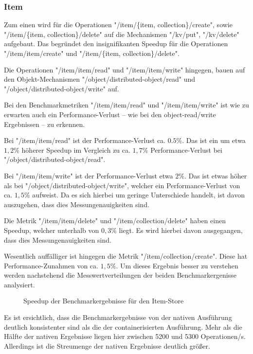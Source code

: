 \subsubsection{Item}

Zum einen wird für die Operationen "/item/\{item, collection\}/create", sowie "/item/\{item, collection\}/delete" auf die Mechanismen "/kv/put", "/kv/delete" aufgebaut. Das begründet den insignifikanten Speedup für die Operationen "/item/item/create" und "/item/\{item, collection\}/delete". 

Die Operationen "/item/item/read" und "/item/item/write" hingegen, bauen auf den Objekt-Mechanismen "/object/distributed-object/read" und "/object/distributed-object/write" auf.

Bei den Benchmarkmetriken "/item/item/read" und "/item/item/write" ist wie zu erwarten auch ein Performance-Verlust – wie bei den object-read/write Ergebnissen – zu erkennen. 

Bei "/item/item/read" ist der Performance-Verlust ca. $0.5\%$. Das ist ein um etwa $1,2\%$ höherer Speedup im Vergleich zu ca. $1,7\%$ Performance-Verlust bei "/object/distributed-object/read". 

Bei "/item/item/write" ist der Performance-Verlust etwa $2\%$. Das ist etwas höher als bei "/object/distributed-object/write", welcher ein Performance-Verlust von ca. $1,5\%$ aufweist. Da es sich hierbei um geringe Unterschiede handelt, ist davon auszugehen, dass dies Messungenauigkeiten sind. 

Die Metrik "/item/item/delete" und "/item/collection/delete" haben einen Speedup, welcher unterhalb von $0,3\%$ liegt. Es wird hierbei davon ausgegangen, dass dies Messungenauigkeiten sind.

Wesentlich auffälliger ist hingegen die Metrik "/item/collection/create". Diese hat Performance-Zunahmen von ca. $1,5\%$. Um dieses Ergebnis besser zu verstehen werden nachstehend die Messwertverteilungen der beiden Benchmarkergenisse analysiert. 

\begin{figure}[H]
    \centering
    
    \caption{Speedup der Benchmarkergebnisse für den Item-Store}
    \label{fig:speedup_item_collection_create}
\end{figure}

\FloatBarrier

Es ist ersichtlich, dass die Benchmarkergebnisse von der nativen Ausführung deutlich konsistenter sind als die der containerisierten Ausführung. Mehr als die Hälfte der nativen Ergebnisse liegen hier zwischen 5200 und 5300 Operationen/s. Allerdings ist die Streumenge der nativen Ergebnisse deutlich größer. 

